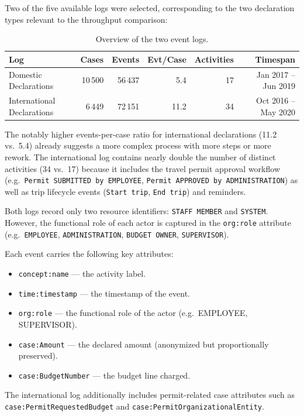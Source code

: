 \documentclass[11pt,a4paper]{article}
\begin{document}
Two of the five available logs were selected, corresponding to the two declaration types relevant to the throughput comparison:

\begin{table}[H]
\centering
\begin{tabular}{@{}lrrrrr@{}}
\toprule
\textbf{Log} & \textbf{Cases} & \textbf{Events} & \textbf{Evt/Case} & \textbf{Activities} & \textbf{Timespan} \\
\midrule
Domestic Declarations    & 10\,500 & 56\,437  & 5.4 & 17 & Jan 2017 -- Jun 2019 \\
International Declarations & 6\,449 & 72\,151 & 11.2 & 34 & Oct 2016 -- May 2020 \\
\bottomrule
\end{tabular}
\caption{Overview of the two event logs.}
\label{tab:logs}
\end{table}

The notably higher events-per-case ratio for international declarations (11.2 vs.\ 5.4) already suggests a more complex process with more steps or more rework. The international log contains nearly double the number of distinct activities (34 vs.\ 17) because it includes the travel permit approval workflow (e.g.\ \texttt{Permit SUBMITTED by EMPLOYEE}, \texttt{Permit APPROVED by ADMINISTRATION}) as well as trip lifecycle events (\texttt{Start trip}, \texttt{End trip}) and reminders.

Both logs record only two resource identifiers: \texttt{STAFF MEMBER} and \texttt{SYSTEM}. However, the functional role of each actor is captured in the \texttt{org:role} attribute (e.g.\ \texttt{EMPLOYEE}, \texttt{ADMINISTRATION}, \texttt{BUDGET OWNER}, \texttt{SUPERVISOR}).

Each event carries the following key attributes:
\begin{itemize}[leftmargin=*]
    \item \texttt{concept:name} — the activity label.
    \item \texttt{time:timestamp} — the timestamp of the event.
    \item \texttt{org:role} — the functional role of the actor (e.g.\ EMPLOYEE, SUPERVISOR).
    \item \texttt{case:Amount} — the declared amount (anonymized but proportionally preserved).
    \item \texttt{case:BudgetNumber} — the budget line charged.
\end{itemize}
The international log additionally includes permit-related case attributes such as \texttt{case:Permit\-RequestedBudget} and \texttt{case:Permit\-OrganizationalEntity}.
\end{document}
